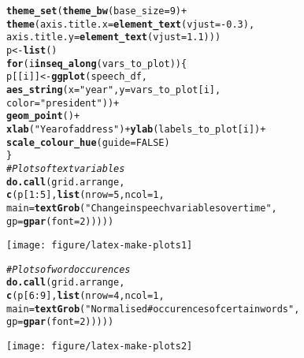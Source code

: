 \documentclass{article}\usepackage[]{graphicx}\usepackage[]{color}
\makeatletter
\def\maxwidth{ %
  \ifdim\Gin@nat@width>\linewidth
    \linewidth
  \else
    \Gin@nat@width
  \fi
}
\newcommand{\hlnum}[1]{\textcolor[rgb]{0.686,0.059,0.569}{#1}}%
\newcommand{\hlstr}[1]{\textcolor[rgb]{0.192,0.494,0.8}{#1}}%
\newcommand{\hlcom}[1]{\textcolor[rgb]{0.678,0.584,0.686}{\textit{#1}}}%
\newcommand{\hlopt}[1]{\textcolor[rgb]{0,0,0}{#1}}%
\newcommand{\hlstd}[1]{\textcolor[rgb]{0.345,0.345,0.345}{#1}}%
\newcommand{\hlkwa}[1]{\textcolor[rgb]{0.161,0.373,0.58}{\textbf{#1}}}%
\newcommand{\hlkwb}[1]{\textcolor[rgb]{0.69,0.353,0.396}{#1}}%
\newcommand{\hlkwc}[1]{\textcolor[rgb]{0.333,0.667,0.333}{#1}}%
\newcommand{\hlkwd}[1]{\textcolor[rgb]{0.737,0.353,0.396}{\textbf{#1}}}%
\newenvironment{kframe}{%
 \def\at@end@of@kframe{}%
 \ifinner\ifhmode%
  \def\at@end@of@kframe{\end{minipage}}%
  \begin{minipage}{\columnwidth}%
 \fi\fi%
 \def\FrameCommand##1{\hskip\@totalleftmargin \hskip-\fboxsep
 \colorbox{shadecolor}{##1}\hskip-\fboxsep
     \hskip-\linewidth \hskip-\@totalleftmargin \hskip\columnwidth}%
 \MakeFramed {\advance\hsize-\width
   \@totalleftmargin\z@ \linewidth\hsize
   \@setminipage}}%
 {\par\unskip\endMakeFramed%
 \at@end@of@kframe}
\newenvironment{knitrout}{}{} %
\makeatother
\begin{document}
\begin{knitrout}
\begin{kframe}
\begin{alltt}
 \hlkwd{theme_set}\hlstd{(}\hlkwd{theme_bw}\hlstd{(}\hlkwc{base_size} \hlstd{=} \hlnum{9}\hlstd{)} \hlopt{+}
             \hlkwd{theme}\hlstd{(}\hlkwc{axis.title.x} \hlstd{=} \hlkwd{element_text}\hlstd{(}\hlkwc{vjust} \hlstd{=} \hlopt{-}\hlnum{0.3}\hlstd{),}
                   \hlkwc{axis.title.y} \hlstd{=} \hlkwd{element_text}\hlstd{(}\hlkwc{vjust} \hlstd{=} \hlnum{1.1}\hlstd{)))}
 \hlstd{p} \hlkwb{<-} \hlkwd{list}\hlstd{()}
 \hlkwa{for} \hlstd{(i} \hlkwa{in} \hlkwd{seq_along}\hlstd{(vars_to_plot)) \{}
   \hlstd{p[[i]]} \hlkwb{<-} \hlkwd{ggplot}\hlstd{(speech_df,}
                    \hlkwd{aes_string}\hlstd{(}\hlkwc{x} \hlstd{=} \hlstr{"year"}\hlstd{,} \hlkwc{y} \hlstd{= vars_to_plot[i],}
                               \hlkwc{color} \hlstd{=} \hlstr{"president"}\hlstd{))} \hlopt{+}
     \hlkwd{geom_point}\hlstd{()} \hlopt{+}
     \hlkwd{xlab}\hlstd{(}\hlstr{"Year of address"}\hlstd{)} \hlopt{+} \hlkwd{ylab}\hlstd{(labels_to_plot[i])} \hlopt{+}
     \hlkwd{scale_colour_hue}\hlstd{(}\hlkwc{guide} \hlstd{=} \hlnum{FALSE}\hlstd{)}
 \hlstd{\}}
 \hlcom{# Plots of text variables}
 \hlkwd{do.call}\hlstd{(grid.arrange,}
         \hlkwd{c}\hlstd{(p[}\hlnum{1}\hlopt{:}\hlnum{5}\hlstd{],} \hlkwd{list}\hlstd{(}\hlkwc{nrow} \hlstd{=} \hlnum{5}\hlstd{,} \hlkwc{ncol} \hlstd{=} \hlnum{1}\hlstd{,}
                        \hlkwc{main} \hlstd{=} \hlkwd{textGrob}\hlstd{(}\hlstr{"Change in speech variables over time"}\hlstd{,}
                                        \hlkwc{gp} \hlstd{=} \hlkwd{gpar}\hlstd{(}\hlkwc{font}\hlstd{=}\hlnum{2}\hlstd{)))))}
\end{alltt}
\end{kframe}
\texttt{[image: figure/latex-make-plots1]} 
\begin{kframe}\begin{alltt}
 \hlcom{# Plots of word occurences}
 \hlkwd{do.call}\hlstd{(grid.arrange,}
         \hlkwd{c}\hlstd{(p[}\hlnum{6}\hlopt{:}\hlnum{9}\hlstd{],} \hlkwd{list}\hlstd{(}\hlkwc{nrow} \hlstd{=} \hlnum{4}\hlstd{,} \hlkwc{ncol} \hlstd{=} \hlnum{1}\hlstd{,}
                        \hlkwc{main} \hlstd{=} \hlkwd{textGrob}\hlstd{(}\hlstr{"Normalised # occurences of certain words"}\hlstd{,}
                                        \hlkwc{gp} \hlstd{=} \hlkwd{gpar}\hlstd{(}\hlkwc{font}\hlstd{=}\hlnum{2}\hlstd{)))))}
\end{alltt}
\end{kframe}
\texttt{[image: figure/latex-make-plots2]} 

\end{knitrout}
\end{document}
